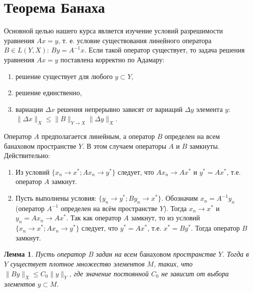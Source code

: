 \documentclass[12pt,a4paper,titlepage, oneside]{book}
\theoremstyle{definition}
\theoremstyle{plain}
\theoremstyle{remark}
\theoremstyle{remark}
\theoremstyle{remark}
\theoremstyle{remark}
\theoremstyle{plain}
\newtheorem*{lemma}{Лемма}
\theoremstyle{plain}
\begin{document}
\section{Теорема Банаха}
Основной целью нашего курса является изучение условий разрешимости уравнения $Ax=y$, т. е. условие существования $\underbar {линейного}$ оператора $B\in L(Y, X)$: $By=A^{-1}x$. Если такой оператор существует, то задача решения уравнения $Ax=y$ поставлена корректно по Адамару:
\begin{enumerate}
	\item решение существует для любого $y \subset Y$,
	\item решение единственно,
	\item вариации $\Delta x$ решения непрерывно зависят от вариаций $\Delta y$ элемента $y$: $\lVert \Delta x\rVert_X \leq \lVert B\rVert_{Y\to X}\lVert \Delta y\rVert_X$.
\end{enumerate}
Оператор $A$ предполагается линейным, а оператор $B$ определен на всем банаховом пространстве $Y$. В этом случаем операторы $A$ и $B$ замкнуты. Действительно:
\begin{enumerate}

	\item Из условий $\{x_n \to x^{*};Ax_n \to y^{*}\}$ следует, что $Ax_n \to Ax^{*}$ и $y^{*}=Ax^{*}$, т.е. оператор $A$ замкнут.

	\item Пусть выполнены условия: $\{y_n \to y^{*}; By_n \to x^{*}\}$. Обозначим $x_n=A^{-1}y_n$ (оператор $A^{-1}$ определен на всём пространстве $Y$). Тогда $x_n \to x^{*}$ и $y_n=Ax_n \to Ax^{*}$. Так как оператор $A$ замкнут, то из условий $\{x_n \to x^{*};Ax_n \to y^{*}\}$ следует, что $y^{*}=Ax^{*}$, т.е. $x^{*}=By^{*}$. Тогда оператор $B$ замкнут.
	
\end{enumerate}
	
\begin{lemma}
Пусть оператор $B$ задан на всем $\underbar {банаховом}$ пространстве $Y$. Тогда в $Y$ существует плотное множество элементов $M$, таких, что $\lVert By\rVert_X \leq C_0\lVert y\rVert_Y $, где значение постоянной $C_0$ не зависит от выбора элементов $y \subset M$.
\end{lemma}
\end{document}
